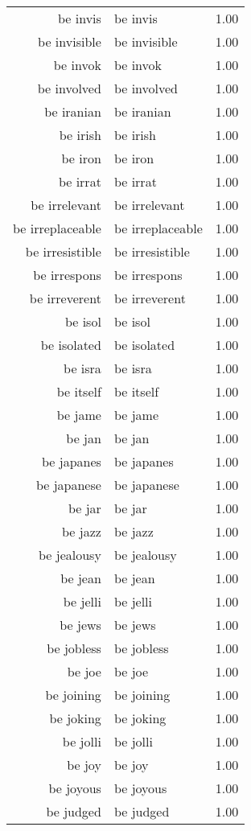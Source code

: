 \begin{table}[ht]
\begin{tabular}{rlr}
  be invis & be invis & 1.00 \\ 
  be invisible & be invisible & 1.00 \\ 
  be invok & be invok & 1.00 \\ 
  be involved & be involved & 1.00 \\ 
  be iranian & be iranian & 1.00 \\ 
  be irish & be irish & 1.00 \\ 
  be iron & be iron & 1.00 \\ 
  be irrat & be irrat & 1.00 \\ 
  be irrelevant & be irrelevant & 1.00 \\ 
  be irreplaceable & be irreplaceable & 1.00 \\ 
  be irresistible & be irresistible & 1.00 \\ 
  be irrespons & be irrespons & 1.00 \\ 
  be irreverent & be irreverent & 1.00 \\ 
  be isol & be isol & 1.00 \\ 
  be isolated & be isolated & 1.00 \\ 
  be isra & be isra & 1.00 \\ 
  be itself & be itself & 1.00 \\ 
  be jame & be jame & 1.00 \\ 
  be jan & be jan & 1.00 \\ 
  be japanes & be japanes & 1.00 \\ 
  be japanese & be japanese & 1.00 \\ 
  be jar & be jar & 1.00 \\ 
  be jazz & be jazz & 1.00 \\ 
  be jealousy & be jealousy & 1.00 \\ 
  be jean & be jean & 1.00 \\ 
  be jelli & be jelli & 1.00 \\ 
  be jews & be jews & 1.00 \\ 
  be jobless & be jobless & 1.00 \\ 
  be joe & be joe & 1.00 \\ 
  be joining & be joining & 1.00 \\ 
  be joking & be joking & 1.00 \\ 
  be jolli & be jolli & 1.00 \\ 
  be joy & be joy & 1.00 \\ 
  be joyous & be joyous & 1.00 \\ 
  be judged & be judged & 1.00 \\ 

\end{tabular}
\end{table}
